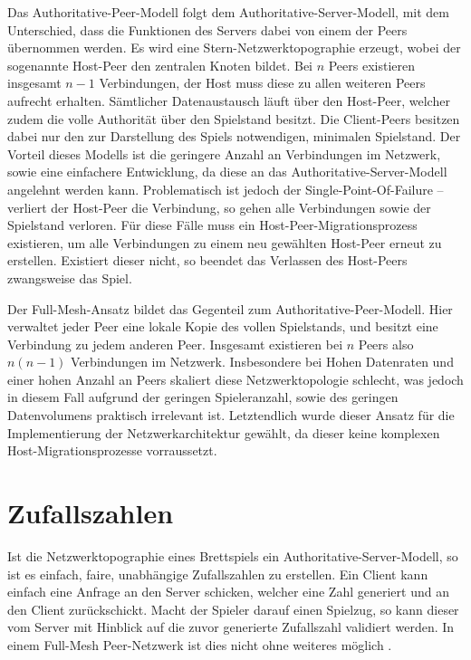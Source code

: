 Das Authoritative-Peer-Modell folgt dem Authoritative-Server-Modell, mit dem Unterschied, dass die Funktionen des Servers dabei von einem der Peers übernommen werden. Es wird eine Stern-Netzwerktopographie erzeugt, wobei der sogenannte \glqq{}Host-Peer\grqq{} den zentralen Knoten bildet. Bei $n$ Peers existieren insgesamt $n-1$ Verbindungen, der Host muss diese zu allen weiteren Peers aufrecht erhalten. Sämtlicher Datenaustausch läuft über den Host-Peer, welcher zudem die volle Authorität über den Spielstand besitzt. Die Client-Peers besitzen dabei nur den zur Darstellung des Spiels notwendigen, minimalen Spielstand. Der Vorteil dieses Modells ist die geringere Anzahl an Verbindungen im Netzwerk, sowie eine einfachere Entwicklung, da diese an das Authoritative-Server-Modell angelehnt werden kann. Problematisch ist jedoch der Single-Point-Of-Failure -- verliert der Host-Peer die Verbindung, so gehen alle Verbindungen sowie der Spielstand verloren. Für diese Fälle muss ein \glqq{}Host-Peer-Migrationsprozess\grqq{} existieren, um alle Verbindungen zu einem neu gewählten Host-Peer erneut zu erstellen. Existiert dieser nicht, so beendet das Verlassen des Host-Peers zwangsweise das Spiel.\par

Der Full-Mesh-Ansatz bildet das Gegenteil zum Authoritative-Peer-Modell. Hier verwaltet jeder Peer eine lokale Kopie des vollen Spielstands, und besitzt eine Verbindung zu jedem anderen Peer. Insgesamt existieren bei $n$ Peers also $n(n-1)$ Verbindungen im Netzwerk. Insbesondere bei Hohen Datenraten und einer hohen Anzahl an Peers skaliert diese Netzwerktopologie schlecht, was jedoch in diesem Fall aufgrund der geringen Spieleranzahl, sowie des geringen Datenvolumens praktisch irrelevant ist. Letztendlich wurde dieser Ansatz für die Implementierung der Netzwerkarchitektur gewählt, da dieser keine komplexen Host-Migrationsprozesse vorraussetzt.\par

\section{Zufallszahlen}
Ist die Netzwerktopographie eines Brettspiels ein Authoritative-Server-Modell, so ist es einfach, faire, unabhängige Zufallszahlen zu erstellen. Ein Client kann einfach eine Anfrage an den Server schicken, welcher eine Zahl generiert und an den Client zurückschickt. Macht der Spieler darauf einen Spielzug, so kann dieser vom Server mit Hinblick auf die zuvor generierte Zufallszahl validiert werden. In einem Full-Mesh Peer-Netzwerk ist dies nicht ohne weiteres möglich \cite{rng}.\par

